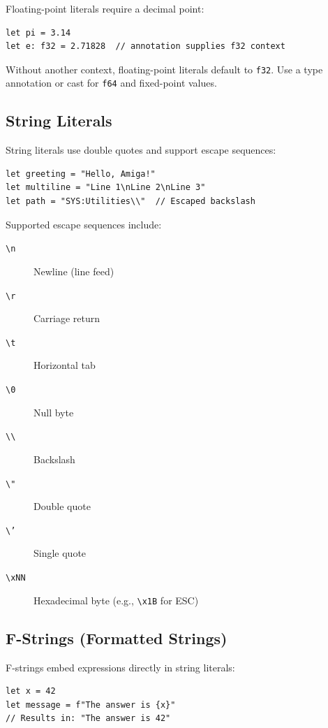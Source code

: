 Floating-point literals require a decimal point:

\begin{lstlisting}
let pi = 3.14
let e: f32 = 2.71828  // annotation supplies f32 context
\end{lstlisting}

Without another context, floating-point literals default to \texttt{f32}. Use a type annotation or cast for \texttt{f64} and fixed-point values.

\subsection{String Literals}

String literals use double quotes and support escape sequences:

\begin{lstlisting}
let greeting = "Hello, Amiga!"
let multiline = "Line 1\nLine 2\nLine 3"
let path = "SYS:Utilities\\"  // Escaped backslash
\end{lstlisting}

Supported escape sequences include:

\begin{description}
    \item[\texttt{\textbackslash n}] Newline (line feed)
    \item[\texttt{\textbackslash r}] Carriage return
    \item[\texttt{\textbackslash t}] Horizontal tab
    \item[\texttt{\textbackslash 0}] Null byte
    \item[\texttt{\textbackslash\textbackslash}] Backslash
    \item[\texttt{\textbackslash"}] Double quote
    \item[\texttt{\textbackslash'}] Single quote
    \item[\texttt{\textbackslash xNN}] Hexadecimal byte (e.g., \texttt{\textbackslash x1B} for ESC)
\end{description}

\subsection{F-Strings (Formatted Strings)}

F-strings embed expressions directly in string literals:

\begin{lstlisting}
let x = 42
let message = f"The answer is {x}"
// Results in: "The answer is 42"
\end{lstlisting}

